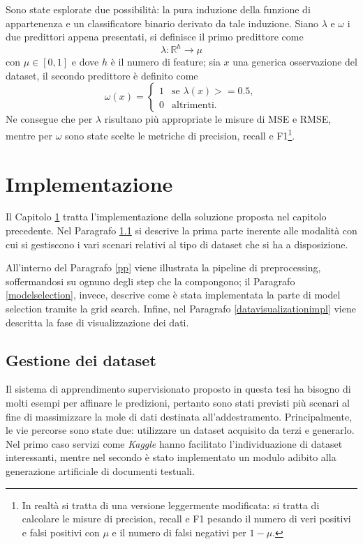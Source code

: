 \documentclass[12pt]{report}
\theoremstyle{definition}
\begin{document}
Sono state esplorate due possibilità: la pura induzione della funzione di appartenenza e un classificatore binario derivato da tale induzione.
Siano $\lambda$ e $\omega$ i due predittori appena presentati, si definisce il primo predittore come
\begin{equation}
    \lambda: \mathbb{R}^h \rightarrow \mu
\end{equation}
con $\mu \in [0,1]$ e dove $h$ è il numero di feature; sia $x$ una generica osservazione del dataset, il secondo predittore è definito come
\begin{equation}
    \omega(x) = \begin{cases} 1 & \mbox{se } \lambda(x) >= 0.5, \\ 0 & \mbox{altrimenti.} \end{cases}
\end{equation}
Ne consegue che per $\lambda$ risultano più appropriate le misure di MSE e RMSE, mentre per $\omega$ sono state scelte le metriche di precision, recall e F1\footnote{In realtà si tratta di una versione leggermente modificata: si tratta di calcolare le misure di precision, recall e F1 pesando il numero di veri positivi e falsi positivi con $\mu$ e il numero di falsi negativi per $1-\mu$.}.

\chapter{Implementazione}
\label{Capitolo 3}
\onehalfspacing
Il Capitolo \ref{Capitolo 3} tratta l'implementazione della soluzione proposta nel capitolo precedente. Nel Paragrafo \ref{datasethandle} si descrive la prima parte inerente alle modalità con cui si gestiscono i vari scenari relativi al tipo di dataset che si ha a disposizione.

All'interno del Paragrafo \ref{pp} viene illustrata la pipeline di preprocessing, soffermandosi su ognuno degli step che la compongono; il Paragrafo \ref{modelselection}, invece, descrive come è stata implementata la parte di model selection tramite la grid search.
Infine, nel Paragrafo \ref{datavisualizationimpl} viene descritta la fase di visualizzazione dei dati.

\section{Gestione dei dataset}\label{datasethandle}
Il sistema di apprendimento supervisionato proposto in questa tesi ha bisogno di molti esempi per affinare le predizioni, pertanto sono stati previsti più scenari al fine di massimizzare la mole di dati destinata all'addestramento. Principalmente, le vie percorse sono state due: utilizzare un dataset acquisito da terzi e generarlo.
Nel primo caso servizi come \textit{Kaggle} hanno facilitato l'individuazione di dataset interessanti, mentre nel secondo è stato implementato un modulo adibito alla generazione artificiale di documenti testuali.
\end{document}
